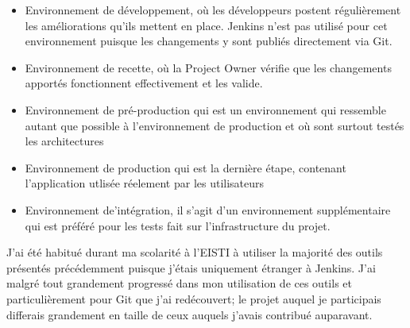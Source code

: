 \begin{itemize}
  \item{Environnement de développement}, où les développeurs postent régulièrement les améliorations qu'ils mettent en place. Jenkins n'est pas utilisé pour cet environnement puisque les changements y sont publiés directement via Git.
  \item{Environnement de recette}, où la Project Owner vérifie que les changements apportés fonctionnent effectivement et les valide.
  \item{Environnement de pré-production} qui est un environnement qui ressemble autant que possible à l'environnement de production et où sont surtout testés les architectures
  \item{Environnement de production} qui est la dernière étape, contenant l'application utlisée réelement par les utilisateurs
  \item{Environnement de'intégration}, il s'agit d'un environnement supplémentaire qui est préféré pour les tests fait sur l'infrastructure du projet.
\end{itemize}
J'ai été habitué durant ma scolarité à l'EISTI à utiliser la majorité des outils présentés précédemment puisque j'étais uniquement étranger à Jenkins.
J'ai malgré tout grandement progressé dans mon utilisation de ces outils et particulièrement pour Git que j'ai redécouvert; le projet auquel je participais differais grandement en taille de ceux auquels j'avais contribué auparavant.
